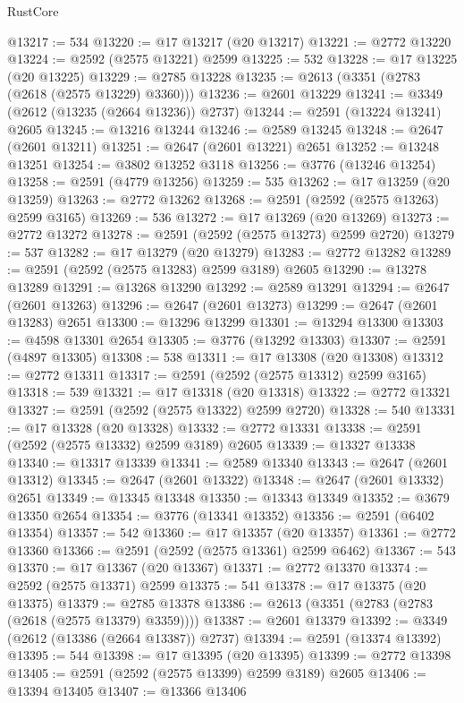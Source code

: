 \begin{lexlean}{RustCore}
\begin{coremodule}
@13217 := 534
@13220 := @17 @13217 (@20 @13217)
@13221 := @2772 @13220
@13224 := @2592 (@2575 @13221) @2599
@13225 := 532
@13228 := @17 @13225 (@20 @13225)
@13229 := @2785 @13228
@13235 := @2613 (@3351 (@2783 (@2618 (@2575 @13229) @3360)))
@13236 := @2601 @13229
@13241 := @3349 (@2612 (@13235 (@2664 @13236)) @2737)
@13244 := @2591 (@13224 @13241) @2605
@13245 := @13216 @13244
@13246 := @2589 @13245
@13248 := @2647 (@2601 @13211)
@13251 := @2647 (@2601 @13221) @2651
@13252 := @13248 @13251
@13254 := @3802 @13252 @3118
@13256 := @3776 (@13246 @13254)
@13258 := @2591 (@4779 @13256)
@13259 := 535
@13262 := @17 @13259 (@20 @13259)
@13263 := @2772 @13262
@13268 := @2591 (@2592 (@2575 @13263) @2599 @3165)
@13269 := 536
@13272 := @17 @13269 (@20 @13269)
@13273 := @2772 @13272
@13278 := @2591 (@2592 (@2575 @13273) @2599 @2720)
@13279 := 537
@13282 := @17 @13279 (@20 @13279)
@13283 := @2772 @13282
@13289 := @2591 (@2592 (@2575 @13283) @2599 @3189) @2605
@13290 := @13278 @13289
@13291 := @13268 @13290
@13292 := @2589 @13291
@13294 := @2647 (@2601 @13263)
@13296 := @2647 (@2601 @13273)
@13299 := @2647 (@2601 @13283) @2651
@13300 := @13296 @13299
@13301 := @13294 @13300
@13303 := @4598 @13301 @2654
@13305 := @3776 (@13292 @13303)
@13307 := @2591 (@4897 @13305)
@13308 := 538
@13311 := @17 @13308 (@20 @13308)
@13312 := @2772 @13311
@13317 := @2591 (@2592 (@2575 @13312) @2599 @3165)
@13318 := 539
@13321 := @17 @13318 (@20 @13318)
@13322 := @2772 @13321
@13327 := @2591 (@2592 (@2575 @13322) @2599 @2720)
@13328 := 540
@13331 := @17 @13328 (@20 @13328)
@13332 := @2772 @13331
@13338 := @2591 (@2592 (@2575 @13332) @2599 @3189) @2605
@13339 := @13327 @13338
@13340 := @13317 @13339
@13341 := @2589 @13340
@13343 := @2647 (@2601 @13312)
@13345 := @2647 (@2601 @13322)
@13348 := @2647 (@2601 @13332) @2651
@13349 := @13345 @13348
@13350 := @13343 @13349
@13352 := @3679 @13350 @2654
@13354 := @3776 (@13341 @13352)
@13356 := @2591 (@6402 @13354)
@13357 := 542
@13360 := @17 @13357 (@20 @13357)
@13361 := @2772 @13360
@13366 := @2591 (@2592 (@2575 @13361) @2599 @6462)
@13367 := 543
@13370 := @17 @13367 (@20 @13367)
@13371 := @2772 @13370
@13374 := @2592 (@2575 @13371) @2599
@13375 := 541
@13378 := @17 @13375 (@20 @13375)
@13379 := @2785 @13378
@13386 := @2613 (@3351 (@2783 (@2783 (@2618 (@2575 @13379) @3359))))
@13387 := @2601 @13379
@13392 := @3349 (@2612 (@13386 (@2664 @13387)) @2737)
@13394 := @2591 (@13374 @13392)
@13395 := 544
@13398 := @17 @13395 (@20 @13395)
@13399 := @2772 @13398
@13405 := @2591 (@2592 (@2575 @13399) @2599 @3189) @2605
@13406 := @13394 @13405
@13407 := @13366 @13406

\end{coremodule}
\end{lexlean}
